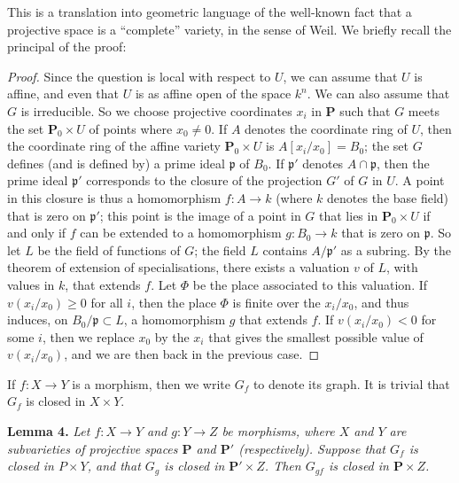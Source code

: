 \documentclass{article}
\newenvironment{itenv}[1]
  {\phantomsection\par\medskip\noindent\textbf{#1.}\itshape}
  {\medskip}
\newcommand{\PP}{\mathbf{P}}
\renewcommand{\geq}{\geqslant}
\newcommand{\oldpage}[1]{\marginpar{\footnotesize$\Big\vert$ \textit{p.~#1}}}
\begin{document}
This is a translation into geometric language of the well-known fact that a projective space is a ``complete'' variety, in the sense of Weil.
We briefly recall the principal of the proof:

\begin{proof}
  Since the question is local with respect to $U$, we can assume that $U$ is affine, and even that $U$ is as affine open of the space $k^n$.
  We can also assume that $G$ is irreducible.
  So we choose projective coordinates $x_i$ in $\PP$ such that $G$ meets the set $\PP_0\times U$ of points where $x_0\neq0$.
  If $A$ denotes the coordinate ring of $U$, then the coordinate ring of the affine variety $\PP_0\times U$ is $A[x_i/x_0]=B_0$;
  the set $G$ defines (and is defined by) a prime ideal $\mathfrak{p}$ of $B_0$.
  If $\mathfrak{p}'$ denotes $A\cap\mathfrak{p}$, then the prime ideal $\mathfrak{p}'$ corresponds to the closure of the projection $G'$ of $G$ in $U$.
  A point in this closure is thus a homomorphism $f\colon A\to k$ (where $k$ denotes the base field) that is zero on $\mathfrak{p}'$;
\oldpage{100}
  this point is the image of a point in $G$ that lies in $\PP_0\times U$ if and only if $f$ can be extended to a homomorphism $g\colon B_0\to k$ that is zero on $\mathfrak{p}$.
  So let $L$ be the field of functions of $G$;
  the field $L$ contains $A/\mathfrak{p}'$ as a subring.
  By the theorem of extension of specialisations, there exists a valuation $v$ of $L$, with values in $k$, that extends $f$.
  Let $\Phi$ be the place associated to this valuation.
  If $v(x_i/x_0)\geq0$ for all $i$, then the place $\Phi$ is finite over the $x_i/x_0$, and thus induces, on $B_0/\mathfrak{p}\subset L$, a homomorphism $g$ that extends $f$.
  If $v(x_i/x_0)<0$ for some $i$, then we replace $x_0$ by the $x_i$ that gives the smallest possible value of $v(x_i/x_0)$, and we are then back in the previous case.
\end{proof}

If $f\colon X\to Y$ is a morphism, then we write $G_f$ to denote its graph.
It is trivial that $G_f$ is closed in $X\times Y$.

\begin{itenv}{Lemma 4}
\label{lemma4}
  Let $f\colon X\to Y$ and $g\colon Y\to Z$ be morphisms, where $X$ and $Y$ are subvarieties of projective spaces $\PP$ and $\PP'$ (respectively).
  Suppose that $G_f$ is closed in $P\times Y$, and that $G_g$ is closed in $\PP'\times Z$.
  Then $G_{gf}$ is closed in $\PP\times Z$.
\end{itenv}
\end{document}
